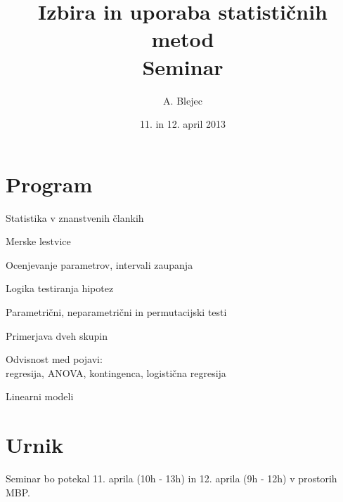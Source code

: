 \documentclass[a4paper,12pt]{article}
\begin{document}
\title{Izbira in uporaba statističnih metod\\Seminar}
\author{A. Blejec}
%

\date{11. in 12. april 2013}%
\maketitle

\section*{Program}

\begin{itemize*}
  \item Statistika v znanstvenih člankih
  \item Merske lestvice
  \item Ocenjevanje parametrov, intervali zaupanja
  \item Logika testiranja hipotez
  \item Parametrični, neparametrični in permutacijski testi
  \item Primerjava dveh skupin
  \item Odvisnost med pojavi:\\ regresija, ANOVA, kontingenca, logistična regresija
  \item Linearni modeli
\end{itemize*}
\section*{Urnik}
Seminar bo potekal 11. aprila (10h - 13h) in 12. aprila (9h - 12h) v prostorih MBP.


%
%
\end{document}

